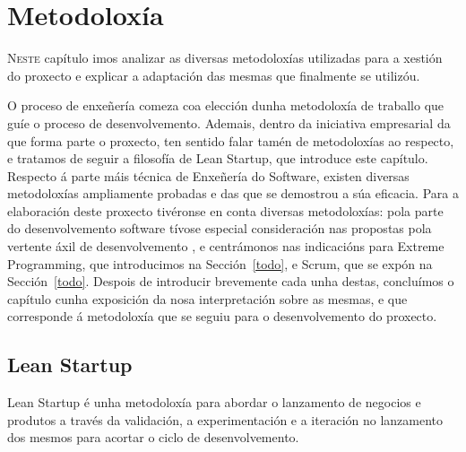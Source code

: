 \chapter{Metodoloxía}
\minitoc


  \lettrine{N}{este} capítulo imos analizar as diversas metodoloxías utilizadas para a 
xestión do proxecto e explicar a adaptación das mesmas que finalmente se utilizóu.


O proceso de enxeñería comeza coa elección dunha metodoloxía de traballo que
guíe o proceso de desenvolvemento. Ademais, dentro da iniciativa empresarial da
que forma parte o proxecto, ten sentido falar tamén de metodoloxías ao respecto,
e tratamos de seguir a filosofía de Lean Startup, que introduce este capítulo.
Respecto á parte máis técnica de Enxeñería do Software, existen diversas
metodoloxías ampliamente probadas e das que se demostrou a súa eficacia. Para a
elaboración deste proxecto tivéronse en conta diversas metodoloxías: pola parte
do desenvolvemento software tívose especial consideración nas propostas pola
vertente áxil de desenvolvemento , e centrámonos nas indicacións para Extreme Programming,
que introducimos na Sección~\ref{todo}, e Scrum, que se expón na
Sección~\ref{todo}. Despois de introducir brevemente cada unha destas,
concluímos o capítulo cunha exposición da nosa interpretación sobre as mesmas, e
que corresponde á metodoloxía que se seguiu para o desenvolvemento do proxecto.


  \section{Lean Startup}
  Lean Startup  é unha metodoloxía para abordar o lanzamento de negocios e 
produtos a través da validación, a experimentación e a iteración no lanzamento 
dos mesmos para acortar o ciclo de desenvolvemento.

